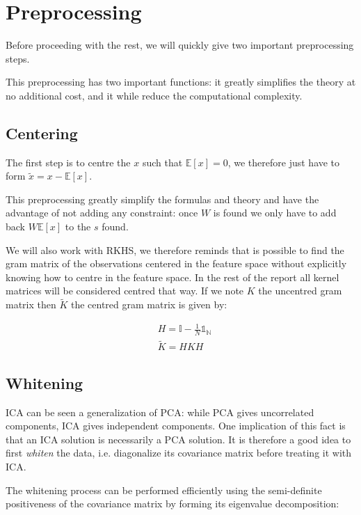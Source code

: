 \documentclass[a4paper,BCOR=5mm,oneside,openany]{scrreprt}
\begin{document}
\chapter{Preprocessing}

Before proceeding with the rest, we will quickly give two important preprocessing steps. 

This preprocessing has two important functions: it greatly simplifies the theory at no additional cost, and it while reduce the computational complexity.

\section{Centering}

The first step is to centre the $x$ such that $\mathbb{E} \left[ x \right] = 0$, we therefore just have to form $\tilde{x} = x -\mathbb{E} \left[ x \right]$.

This preprocessing greatly simplify the formulas and theory and have the advantage of not adding any constraint: once $W$ is found we only have to add back $W \mathbb{E} \left[ x \right]$ to the $s$ found.

We will also work with RKHS, we therefore reminds that is possible to find the gram matrix of the observations centered in the feature space without explicitly knowing how to centre in the feature space. In the rest of the report all kernel matrices will be considered centred that way. If we note $K$ the uncentred gram matrix then $\tilde{K}$ the centred gram matrix is given by:

\begin{align*}
	&H = \mathbb{I} - \frac{1}{N} \mathds{1_N} \\
  	&\tilde{K} = H K H
\end{align*}

\section{Whitening}\label{whitening}

ICA can be seen a generalization of PCA: while PCA gives uncorrelated components, ICA gives independent components. One implication of this fact is that an ICA solution is necessarily a PCA solution. It is therefore a good idea to first \emph{whiten} the data, i.e. diagonalize its covariance matrix before treating it with ICA.

The whitening process can be performed efficiently using the semi-definite positiveness of the covariance matrix by forming its eigenvalue decomposition:
\end{document}

